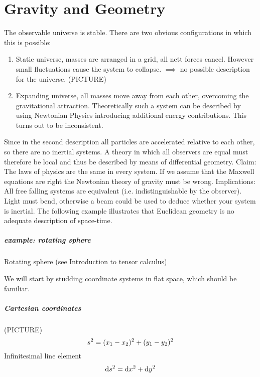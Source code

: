 \chapter{Gravity and Geometry}
The observable universe is stable. There are two obvious configurations in which this is possible:
\begin{enumerate}
    \item Static universe, masses are arranged in a grid, all nett forces cancel. However small fluctuations cause the system to collapse.
    $\implies$ no possible description for the universe. (PICTURE)
    \item Expanding universe, all masses move away from each other, overcoming the gravitational attraction. Theoretically such a system can be described by using Newtonian Physics introducing additional energy contributions. This turns out to be inconsistent.
\end{enumerate}
Since in the second description all particles are accelerated relative to each other, so there are no inertial systems. A theory in which all observers are equal must therefore be local and thus be described by means of differential geometry.
Claim: The laws of physics are the same in every system.
If we assume that the Maxwell equations are right the Newtonian theory of gravity must be wrong.
Implications:
All free falling systems are equivalent (i.e. indistinguishable by the observer). Light must bend, otherwise a beam could be used to deduce whether your system is inertial.
The following example illustrates that Euclidean geometry is no adequate description of space-time.
\paragraph{example: rotating sphere}
Rotating sphere (see Introduction to tensor calculus)
\par
We will start by studding coordinate systems in flat space, which should be familiar.
\paragraph{Cartesian coordinates}
(PICTURE)
\begin{equation*}
s^2=(x_1-x_2)^2+(y_1-y_2)^2\\
\end{equation*}
Infinitesimal line element
\begin{equation}
    \dif s^2=\dif x^2+\dif y^2  \label{eq:cartline}
\end{equation}
